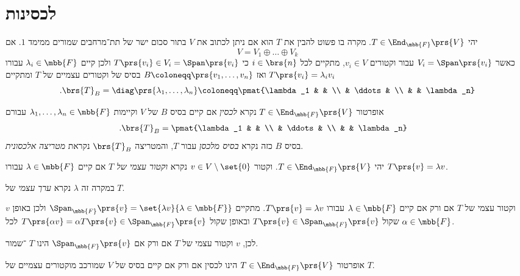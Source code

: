 \documentclass[a4paper,10pt,twoside,openany]{book}
\begin{document}
\section{לכסינות}

יהי
$T \in \End_{\mbb{F}}\prs{V}$.
מקרה בו פשוט להבין את
$T$
הוא אם ניתן לכתוב את
$V$
בתור סכום ישר של תת־מרחבים שמורים ממימד
$1$.
אם
\[V = V_1 \oplus \ldots \oplus V_k\]
כאשר
$V_i = \Span\prs{v_i}$
עבור וקטורים
$v_i \in V$,
מתקיים לכל
$i \in \brs{n}$
כי
$T\prs{v_i} \in V_i = \Span\prs{v_i}$
ולכן קיים
$\lambda_i \in \mbb{F}$
עבורו
$T\prs{v_i} = \lambda_i v_i$
ואז
$B \coloneqq \prs{v_1, \ldots, v_n}$
בסיס של וקטורים עצמיים של
$T$
ומתקיים
\[\text{.} \brs{T}_B = \diag\prs{\lambda_1, \ldots, \lambda_n} \coloneqq \pmat{\lambda_1 & & \\ & \ddots &  \\  &  & \lambda_n}\]

\begin{definition}
אופרטור
$T \in \End_{\mbb{F}}\prs{V}$
נקרא
\emph{לכסין}
אם קיים בסיס
$B$
של
$V$
וקיימות
$\lambda_1, \ldots, \lambda_n \in \mbb{F}$
עבורם
\begin{align*}
\text{.} \brs{T}_B &= \pmat{\lambda_1 & & \\ & \ddots &  \\  &  & \lambda_n}
\end{align*}
בסיס
$B$
כזה נקרא
\emph{בסיס מלכסן}
עבור
$T$,
והמטריצה
$\brs{T}_B$
נקראת
\emph{מטריצה אלכסונית}.
\end{definition}

\begin{definition}
יהי
$T \in \End_{\mbb{F}}\prs{V}$.
וקטור
$v \in V \setminus \set{0}$
נקרא
\emph{וקטור עצמי של
$T$}
אם קיים
$\lambda \in \mbb{F}$
עבורו
$T\prs{v} = \lambda v$.

במקרה זה
$\lambda$
נקרא
\emph{ערך עצמי}
של
$T$.
\end{definition}

\begin{remark}
$v$
וקטור עצמי של
$T$
אם ורק אם קיים
$\lambda \in \mbb{F}$
עבורו
$T\prs{v} = \lambda v$.
מתקיים
$\Span_{\mbb{F}}\prs{v} = \set{\lambda v}{\lambda \in \mbb{F}}$
ולכן באופן שקול
$T\prs{v} \in \Span_{\mbb{F}}\prs{v}$
ובאופן שקול
$T\prs{\alpha v} = \alpha T\prs{v} \in \Span_{\mbb{F}}\prs{v}$
לכל
$\alpha \in \mbb{F}$.

לכן,
$v$
וקטור עצמי של
$T$
אם ורק אם
$\Span_{\mbb{F}}\prs{v}$
הינו
$T$%
־שמור.
\end{remark}

\begin{remark}
אופרטור
$T \in \End_{\mbb{F}}\prs{V}$
הינו לכסין אם ורק אם קיים בסיס של
$V$
שמורכב מוקטורים עצמיים של
$T$.
\end{remark}
\end{document}
